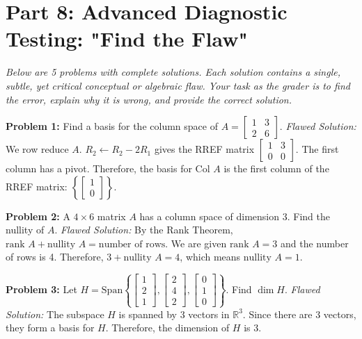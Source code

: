 \documentclass[12pt]{article}
\begin{document}
\newpage
\section{Part 8: Advanced Diagnostic Testing: "Find the Flaw"}
\textit{Below are 5 problems with complete solutions. Each solution contains a single, subtle, yet critical conceptual or algebraic flaw. Your task as the grader is to find the error, explain why it is wrong, and provide the correct solution.}

\vspace{0.5cm}
\textbf{Problem 1:} Find a basis for the column space of $A = \begin{bmatrix} 1 & 3 \\ 2 & 6 \end{bmatrix}$.
\newline
\textit{Flawed Solution:} We row reduce $A$. $R_2 \leftarrow R_2 - 2R_1$ gives the RREF matrix $\begin{bmatrix} 1 & 3 \\ 0 & 0 \end{bmatrix}$. The first column has a pivot. Therefore, the basis for $\text{Col } A$ is the first column of the RREF matrix: $\left\{ \begin{bmatrix} 1 \\ 0 \end{bmatrix} \right\}$.

\vspace{0.5cm}
\textbf{Problem 2:} A $4 \times 6$ matrix $A$ has a column space of dimension 3. Find the nullity of $A$.
\newline
\textit{Flawed Solution:} By the Rank Theorem, $\text{rank } A + \text{nullity } A = \text{number of rows}$. We are given $\text{rank } A = 3$ and the number of rows is 4. Therefore, $3 + \text{nullity } A = 4$, which means $\text{nullity } A = 1$.

\vspace{0.5cm}
\textbf{Problem 3:} Let $H = \text{Span}\left\{ \begin{bmatrix} 1 \\ 2 \\ 1 \end{bmatrix}, \begin{bmatrix} 2 \\ 4 \\ 2 \end{bmatrix}, \begin{bmatrix} 0 \\ 1 \\ 0 \end{bmatrix} \right\}$. Find $\dim H$.
\newline
\textit{Flawed Solution:} The subspace $H$ is spanned by 3 vectors in $\mathbb{R}^3$. Since there are 3 vectors, they form a basis for $H$. Therefore, the dimension of $H$ is 3.
\end{document}
